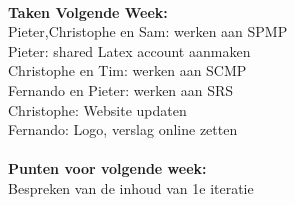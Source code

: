 \\
\textbf{Taken Volgende Week:}\\
Pieter,Christophe en Sam: werken aan SPMP\\
Pieter: shared Latex account aanmaken\\
Christophe en Tim: werken aan SCMP \\
Fernando en Pieter: werken aan SRS\\
Christophe: Website updaten\\
Fernando: Logo, verslag online zetten\\
\\
\textbf{Punten voor volgende week:}\\
Bespreken van de inhoud van 1e iteratie\\

